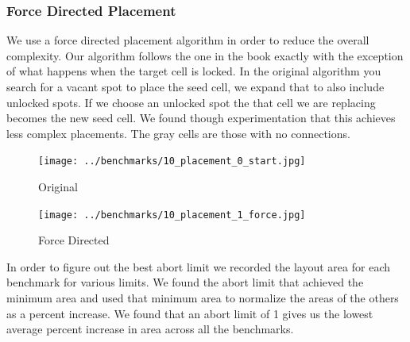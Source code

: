 \documentclass[10pt]{article}
\begin{document}
        \newpage
        \subsubsection{Force Directed Placement}

        We use a force directed placement algorithm in order to reduce the
        overall complexity. Our algorithm follows the one in the book exactly
        with the exception of what happens when the target cell is locked. In
        the original algorithm you search for a vacant spot to place the seed
        cell, we expand that to also include unlocked spots. If we choose an
        unlocked spot the that cell we are replacing becomes the new seed cell.
        We found though experimentation that this achieves less complex
        placements. The gray cells are those with no connections.

        \begin{figure}[H]
            \centering
            \texttt{[image: ../benchmarks/10\_placement\_0\_start.jpg]}
            \caption{Original}
        \end{figure}
        \begin{figure}[H]
            \centering
            \texttt{[image: ../benchmarks/10\_placement\_1\_force.jpg]}
            \caption{Force Directed}
        \end{figure}

        In order to figure out the best abort limit we recorded the layout area
        for each benchmark for various limits. We found the abort limit that
        achieved the minimum area and used that minimum area to normalize the
        areas of the others as a percent increase. We found that an abort limit
        of 1 gives us the lowest average percent increase in area across all
        the benchmarks.
\end{document}

